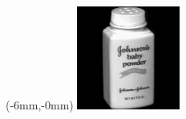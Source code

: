 \documentclass[a4paper,12pt]{article}
\begin{document}
\begin{titlepage}
\begin{textblock*}{297mm}(-6mm,-0mm)
\includegraphics[width=\paperwidth]
{frontpages/obj8__68.png}\end{textblock*} \
\end{titlepage}
\setlength{\columnseprule}{0.5pt}
\begin{multicols}{2}
\tableofcontents
\end{multicols}
\pagebreak
\end{document}
